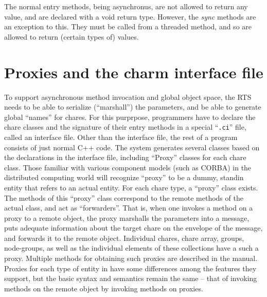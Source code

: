 The normal entry methods, being asynchronus, are not allowed to return
any value, and are declared with a void return type. However, the {\em
sync} methods are an exception to this. They must be called from a
threaded method, and so are allowed to return (certain types of)
values.  

\section{Proxies and the charm interface file}
\label{proxies}

To support asynchronous method invocation and global object space, the
RTS needs to be able to serialize (``marshall'') the parameters, and
be able to generate global ``names'' for chares. For this purprpose,
programmers have to declare the chare classes and the signature of
their entry methods in a special ``\verb#.ci#'' file, called an
interface file. Other than the interface file, the rest of a \charm
program consists of just normal C++ code. The system generates several
classes based on the declarations in the interface file, including
``Proxy'' classes for each chare class.
Those familiar with various component models (such as CORBA) in the
distributed computing world will recognize ``proxy'' to be a dummy, standin
entity that refers to an actual entity.  For each chare type, a ``proxy''
class exists.
The methods of
this ``proxy'' class correspond to the remote methods of the actual class, and
act as ``forwarders''. That is, when one invokes a method on a proxy to a
remote object, the proxy marshalls the parameters into a message, puts
adequate information about the target chare on the envelope of the
message, and forwards it to the
remote object. 
Individual chares, chare array, groups, node-groups, as well as the
individual elements of these collections have a such a
proxy. Multiple methods for obtaining such proxies are described in
the manual.
Proxies for each type of entity in \charm
have some differences among the features they support, but the basic
syntax and semantics remain the same -- that of invoking methods on
the remote object by invoking methods on proxies.



